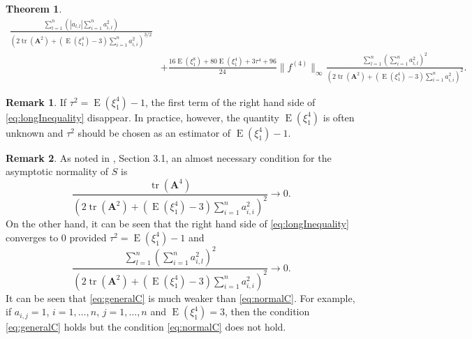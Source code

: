 \documentclass[11pt]{article}
\DeclareMathOperator{\mytr}{tr}
\DeclareMathOperator{\myE}{E}
\newcommand{\BA}{\mathbf{A}}    \newcommand{\BB}{\mathbf{B}}    \newcommand{\BC}{\mathbf{C}}    \newcommand{\BD}{\mathbf{D}}    \newcommand{\BE}{\mathbf{E}}    \newcommand{\BF}{\mathbf{F}}    \newcommand{\BG}{\mathbf{G}}    \newcommand{\BH}{\mathbf{H}}    \newcommand{\BI}{\mathbf{I}}    \newcommand{\BJ}{\mathbf{J}}    \newcommand{\BK}{\mathbf{K}}    \newcommand{\BL}{\mathbf{L}}
\theoremstyle{plain}
\newtheorem{theorem}{\quad\quad Theorem}
\theoremstyle{definition}
\newtheorem{remark}{\quad\quad Remark}
\theoremstyle{remark}
\begin{document}
\begin{theorem}
\begin{equation}
\begin{split}
            \frac{
            \sum_{l=1}^n 
            \left(|a_{l,l}|
         \sum_{i=1}^{n} a_{i,l}^2 
     \right)
 }{
    \left(
        2 \mytr(\BA^2)
    +
    (\myE (\xi_1^4)-3) \sum_{i=1}^n a_{i,i}^2
\right)^{3/2}
 }
         \\
            &+
            \frac{
             16 \myE (\xi_1^8) + 80 \myE (\xi_1^4) + 3\tau^4 + 96 
            }{24} \|f^{(4)} \|_{\infty} 
            \frac{
                \sum_{l=1}^n \left( \sum_{i=1}^n a_{i,l}^2 \right)^2
            }{
            \left(
        2 \mytr(\BA^2)
    +
    (\myE (\xi_1^4)-3)\sum_{i=1}^n a_{i,i}^2
\right)^{2}
            }
            .
        \end{split}
    \end{equation}
    \label{approximation}
\end{theorem}
\begin{remark}\label{remark1}
    If $\tau^2=\myE (\xi_1^4) -1$, the first term of the right hand side of \eqref{eq:longInequality} disappear.
    In practice, however, the quantity $\myE (\xi_1^4)$ is often unknown and
    $\tau^2$ should be chosen as an estimator of $\myE (\xi_1^4)-1$.
\end{remark}

\begin{remark}
    As noted in \cite{Chatterjee2008}, Section 3.1, an almost necessary condition for the asymptotic normality of $S$ is
    \begin{equation}\label{eq:normalC}
        \frac{\mytr (\BA^4)}{
            \left( 
        2 \mytr(\BA^2)
    +
    (\myE (\xi_1^4)-3)\sum_{i=1}^n a_{i,i}^2
            \right)^2
        }\to 0. 
    \end{equation}
    On the other hand, it can be seen that the right hand side of \eqref{eq:longInequality} converges to $0$ provided $\tau^2=\myE (\xi_1^4)-1$ and
    \begin{equation}\label{eq:generalC}
            \frac{
                \sum_{l=1}^n \left( \sum_{i=1}^n a_{i,l}^2 \right)^2
            }{
            \left(
        2 \mytr(\BA^2)
    +
    (\myE (\xi_1^4)-3)\sum_{i=1}^n a_{i,i}^2
\right)^{2}
            }
            \to 0.
    \end{equation}
    It can be seen that \eqref{eq:generalC} is much weaker than \eqref{eq:normalC}.
    For example, if $a_{i,j}=1$, $i=1,\ldots, n$, $j=1,\ldots, n$ and $\myE (\xi_1^4)=3$, then the condition \eqref{eq:generalC} holds but the condition \eqref{eq:normalC} does not hold.
\end{remark}
\end{document}

